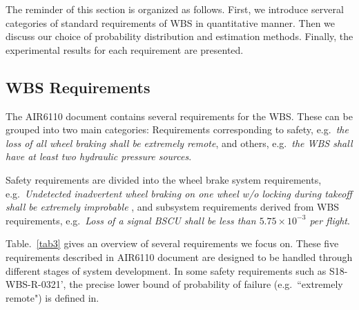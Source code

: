 The reminder of this section is organized as follows. First, we introduce serveral categories of standard requirements of WBS in quantitative manner. Then we discuss our choice of probability distribution and estimation methods. Finally, the experimental results for each requirement are presented.

\subsection{WBS Requirements}
The AIR6110 document contains several requirements for the WBS. These can be grouped into two main categories: Requirements corresponding to safety, e.g.\ \emph{the loss of all wheel braking shall be extremely remote}, and others, e.g.\ \emph{the WBS shall have at least two hydraulic pressure sources}.

Safety requirements are divided into the wheel brake system requirements, e.g.\ \emph{Undetected inadvertent wheel braking on one wheel w/o locking during takeoff shall be extremely improbable
}, and subsystem requirements derived from WBS requirements, e.g.\ \emph{Loss of a signal BSCU shall be less than $5.75\times10^{-3}$ per flight}.

Table.~\ref{tab3} gives an overview of several requirements we focus on. These five requirements described in AIR6110 document are designed to be handled through different stages of system development. In some safety requirements such as S18-WBS-R-0321', the precise lower bound of probability of failure (e.g.\ ``extremely remote") is defined in\cite{ac}.



